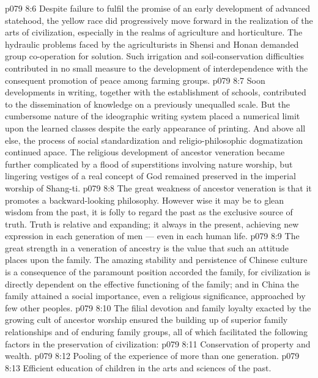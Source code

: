 \vs p079 8:6 Despite failure to fulfil the promise of an early development of advanced statehood, the yellow race did progressively move forward in the realization of the arts of civilization, especially in the realms of agriculture and horticulture. The hydraulic problems faced by the agriculturists in Shensi and Honan demanded group co\hyp{}operation for solution. Such irrigation and soil\hyp{}conservation difficulties contributed in no small measure to the development of interdependence with the consequent promotion of peace among farming groups.
\vs p079 8:7 Soon developments in writing, together with the establishment of schools, contributed to the dissemination of knowledge on a previously unequalled scale. But the cumbersome nature of the ideographic writing system placed a numerical limit upon the learned classes despite the early appearance of printing. And above all else, the process of social standardization and religio\hyp{}philosophic dogmatization continued apace. The religious development of ancestor veneration became further complicated by a flood of superstitions involving nature worship, but lingering vestiges of a real concept of God remained preserved in the imperial worship of Shang\hyp{}ti.
\vs p079 8:8 The great weakness of ancestor veneration is that it promotes a backward\hyp{}looking philosophy. However wise it may be to glean wisdom from the past, it is folly to regard the past as the exclusive source of truth. Truth is relative and expanding; it  always in the present, achieving new expression in each generation of men --- even in each human life.
\vs p079 8:9 The great strength in a veneration of ancestry is the value that such an attitude places upon the family. The amazing stability and persistence of Chinese culture is a consequence of the paramount position accorded the family, for civilization is directly dependent on the effective functioning of the family; and in China the family attained a social importance, even a religious significance, approached by few other peoples.
\vs p079 8:10 The filial devotion and family loyalty exacted by the growing cult of ancestor worship ensured the building up of superior family relationships and of enduring family groups, all of which facilitated the following factors in the preservation of civilization:
\vs p079 8:11 \bibnobreakspace Conservation of property and wealth.
\vs p079 8:12 \bibnobreakspace Pooling of the experience of more than one generation.
\vs p079 8:13 \bibnobreakspace Efficient education of children in the arts and sciences of the past.
